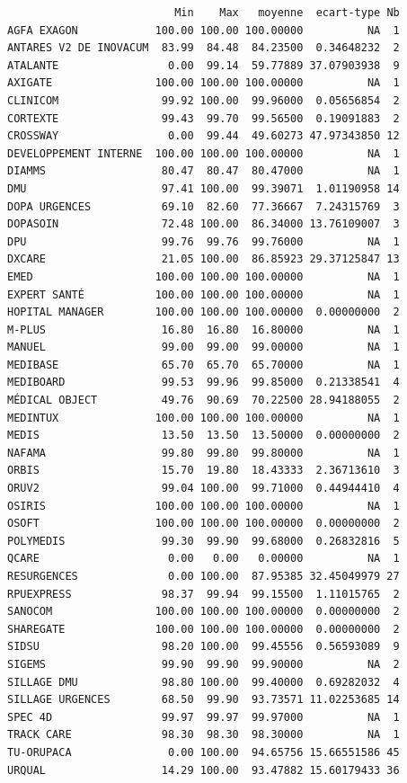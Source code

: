 \documentclass[]{article}
\begin{document}
\begin{verbatim}
                          Min    Max   moyenne  ecart-type Nb
AGFA EXAGON            100.00 100.00 100.00000          NA  1
ANTARES V2 DE INOVACUM  83.99  84.48  84.23500  0.34648232  2
ATALANTE                 0.00  99.14  59.77889 37.07903938  9
AXIGATE                100.00 100.00 100.00000          NA  1
CLINICOM                99.92 100.00  99.96000  0.05656854  2
CORTEXTE                99.43  99.70  99.56500  0.19091883  2
CROSSWAY                 0.00  99.44  49.60273 47.97343850 12
DEVELOPPEMENT INTERNE  100.00 100.00 100.00000          NA  1
DIAMMS                  80.47  80.47  80.47000          NA  1
DMU                     97.41 100.00  99.39071  1.01190958 14
DOPA URGENCES           69.10  82.60  77.36667  7.24315769  3
DOPASOIN                72.48 100.00  86.34000 13.76109007  3
DPU                     99.76  99.76  99.76000          NA  1
DXCARE                  21.05 100.00  86.85923 29.37125847 13
EMED                   100.00 100.00 100.00000          NA  1
EXPERT SANTÉ           100.00 100.00 100.00000          NA  1
HOPITAL MANAGER        100.00 100.00 100.00000  0.00000000  2
M-PLUS                  16.80  16.80  16.80000          NA  1
MANUEL                  99.00  99.00  99.00000          NA  1
MEDIBASE                65.70  65.70  65.70000          NA  1
MEDIBOARD               99.53  99.96  99.85000  0.21338541  4
MÉDICAL OBJECT          49.76  90.69  70.22500 28.94188055  2
MEDINTUX               100.00 100.00 100.00000          NA  1
MEDIS                   13.50  13.50  13.50000  0.00000000  2
NAFAMA                  99.80  99.80  99.80000          NA  1
ORBIS                   15.70  19.80  18.43333  2.36713610  3
ORUV2                   99.04 100.00  99.71000  0.44944410  4
OSIRIS                 100.00 100.00 100.00000          NA  1
OSOFT                  100.00 100.00 100.00000  0.00000000  2
POLYMEDIS               99.30  99.90  99.68000  0.26832816  5
QCARE                    0.00   0.00   0.00000          NA  1
RESURGENCES              0.00 100.00  87.95385 32.45049979 27
RPUEXPRESS              98.37  99.94  99.15500  1.11015765  2
SANOCOM                100.00 100.00 100.00000  0.00000000  2
SHAREGATE              100.00 100.00 100.00000  0.00000000  2
SIDSU                   98.20 100.00  99.45556  0.56593089  9
SIGEMS                  99.90  99.90  99.90000          NA  2
SILLAGE DMU             98.80 100.00  99.40000  0.69282032  4
SILLAGE URGENCES        68.50  99.90  93.73571 11.02253685 14
SPEC 4D                 99.97  99.97  99.97000          NA  1
TRACK CARE              98.30  98.30  98.30000          NA  1
TU-ORUPACA               0.00 100.00  94.65756 15.66551586 45
URQUAL                  14.29 100.00  93.47882 15.60179433 36
\end{verbatim}
\end{document}

